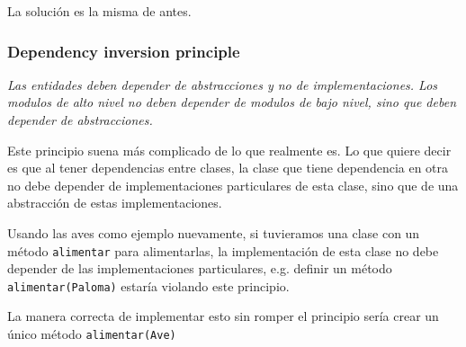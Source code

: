         La solución es la misma de antes.

      \subsubsection{Dependency inversion principle}
        \textit{Las entidades deben depender de abstracciones y no de implementaciones. 
        Los modulos de alto nivel no deben depender de modulos de bajo nivel, sino que 
        deben depender de abstracciones.}

        Este principio suena más complicado de lo que realmente es.
        Lo que quiere decir es que al tener dependencias entre clases, la clase que tiene
        dependencia en otra no debe depender de implementaciones particulares de esta 
        clase, sino que de una abstracción de estas implementaciones.

        Usando las aves como ejemplo nuevamente, si tuvieramos una clase con un método 
        \texttt{alimentar} para alimentarlas, la implementación de esta clase no debe 
        depender de las implementaciones particulares, e.g. definir un método 
        \texttt{alimentar(Paloma)} estaría violando este principio.

        La manera correcta de implementar esto sin romper el principio sería crear un 
        único método \texttt{alimentar(Ave)}
%